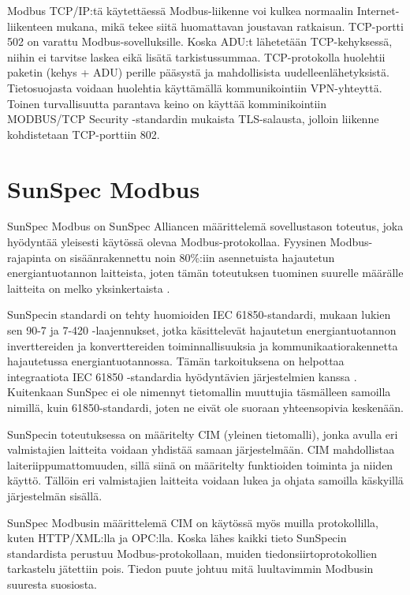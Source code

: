     Modbus TCP/IP:tä käytettäessä Modbus-liikenne voi kulkea normaalin Internet-liikenteen mukana, mikä tekee siitä huomattavan joustavan ratkaisun. TCP-portti 502 on varattu Modbus-sovelluksille.\parencite{modbusTCPIPSpec} Koska ADU:t lähetetään TCP-kehyksessä, niihin ei tarvitse laskea eikä lisätä tarkistussummaa. TCP-protokolla huolehtii paketin (kehys + ADU) perille pääsystä ja mahdollisista uudelleenlähetyksistä. Tietosuojasta voidaan huolehtia käyttämällä kommunikointiin \gls{VPN}-yhteyttä. Toinen turvallisuutta parantava keino on käyttää komminikointiin MODBUS/TCP Security -standardin mukaista TLS-salausta, jolloin liikenne kohdistetaan TCP-porttiin 802\parencite{modbusTCPIPTLSSpec}.

\section{SunSpec Modbus}
  SunSpec Modbus on SunSpec Alliancen määrittelemä sovellustason toteutus, joka hyödyntää yleisesti käytössä olevaa Modbus-protokollaa.  Fyysinen Modbus-rajapinta on sisäänrakennettu noin 80\%:iin asennetuista hajautetun energiantuotannon laitteista, joten tämän toteutuksen tuominen suurelle määrälle laitteita on melko yksinkertaista \parencite{SSFactSheet}. 
  
  SunSpecin standardi on tehty huomioiden IEC 61850-standardi, mukaan lukien sen 90-7 ja 7-420 -laajennukset, jotka käsittelevät hajautetun energiantuotannon inverttereiden ja konverttereiden toiminnallisuuksia ja kommunikaatiorakennetta hajautetussa energiantuotannossa. Tämän tarkoituksena on helpottaa integraatiota IEC 61850 -standardia hyödyntävien järjestelmien kanssa \parencite{SSTech}. Kuitenkaan SunSpec ei ole nimennyt tietomallin muuttujia täsmälleen samoilla nimillä, kuin 61850-standardi, joten ne eivät ole suoraan yhteensopivia keskenään.

  SunSpecin toteutuksessa on määritelty CIM (yleinen tietomalli), jonka avulla eri valmistajien laitteita voidaan yhdistää samaan järjestelmään. CIM mahdollistaa laiteriippumattomuuden, sillä siinä on määritelty funktioiden toiminta ja niiden käyttö. Tällöin eri valmistajien laitteita voidaan lukea ja ohjata samoilla käskyillä järjestelmän sisällä.

  SunSpec Modbusin määrittelemä CIM on käytössä myös muilla protokollilla, kuten HTTP/XML:lla ja OPC:lla. Koska lähes kaikki tieto SunSpecin standardista perustuu Modbus-protokollaan, muiden tiedonsiirtoprotokollien tarkastelu jätettiin pois. Tiedon puute johtuu mitä luultavimmin Modbusin suuresta suosiosta.

